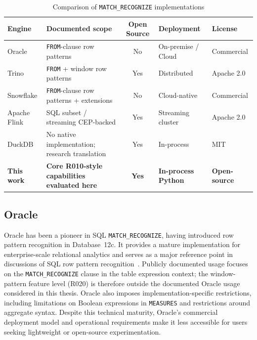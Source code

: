 \begin{table}[htbp]
  \centering
  \caption{Comparison of \texttt{MATCH\_RECOGNIZE} implementations}
  \label{tab:engine-comparison}
  \small
  \setlength{\tabcolsep}{3pt}
  \begin{tabularx}{\textwidth}{l>{\raggedright\arraybackslash}Xcll}
    \toprule
    \textbf{Engine} & \textbf{Documented scope} & \textbf{Open Source} & \textbf{Deployment} & \textbf{License} \\
    \midrule
    Oracle       & \texttt{FROM}-clause row patterns & No  & On-premise / Cloud & Commercial  \\
    Trino        & \texttt{FROM} + window row patterns & Yes & Distributed        & Apache 2.0  \\
    Snowflake    & \texttt{FROM}-clause row patterns + extensions & No  & Cloud-native       & Commercial  \\
    Apache Flink & SQL subset / streaming CEP-backed & Yes & Streaming cluster  & Apache 2.0  \\
    DuckDB       & No native implementation; research translation & Yes & In-process         & MIT         \\
    \midrule
    \textbf{This work} & \textbf{Core R010-style capabilities evaluated here} & \textbf{Yes} & \textbf{In-process Python} & \textbf{Open-source} \\
    \bottomrule
  \end{tabularx}
\end{table}

\subsection{Oracle}
\label{subsec:related-oracle}

Oracle has been a pioneer in SQL \texttt{MATCH\_RECOGNIZE}, having
introduced row pattern recognition in Database~12c.  It provides a
mature implementation for enterprise-scale relational analytics and
serves as a major reference point in discussions of SQL row pattern
recognition~\cite{oracle2022,oracle2021dwhsg,book}.  Publicly
documented usage focuses on the \texttt{MATCH\_RECOGNIZE} clause in
the table expression context; the window-pattern feature level
(R020) is therefore outside the documented Oracle usage considered
in this thesis.  Oracle also imposes implementation-specific
restrictions, including limitations on Boolean expressions in
\texttt{MEASURES} and restrictions around aggregate syntax.
Despite this technical maturity, Oracle's commercial deployment model
and operational requirements make it less accessible for users seeking
lightweight or open-source experimentation.

